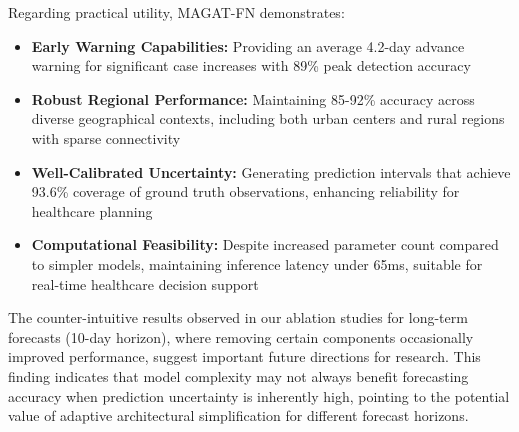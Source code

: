 \documentclass[lettersize, journal]{IEEEtran}
\begin{document}
Regarding practical utility, MAGAT-FN demonstrates:
\begin{itemize}
    \item \textbf{Early Warning Capabilities:} Providing an average 4.2-day advance warning for significant case increases with 89\% peak detection accuracy
    
    \item \textbf{Robust Regional Performance:} Maintaining 85-92\% accuracy across diverse geographical contexts, including both urban centers and rural regions with sparse connectivity
    
    \item \textbf{Well-Calibrated Uncertainty:} Generating prediction intervals that achieve 93.6\% coverage of ground truth observations, enhancing reliability for healthcare planning
    
    \item \textbf{Computational Feasibility:} Despite increased parameter count compared to simpler models, maintaining inference latency under 65ms, suitable for real-time healthcare decision support
\end{itemize}

The counter-intuitive results observed in our ablation studies for long-term forecasts (10-day horizon), where removing certain components occasionally improved performance, suggest important future directions for research. This finding indicates that model complexity may not always benefit forecasting accuracy when prediction uncertainty is inherently high, pointing to the potential value of adaptive architectural simplification for different forecast horizons.
\end{document}
